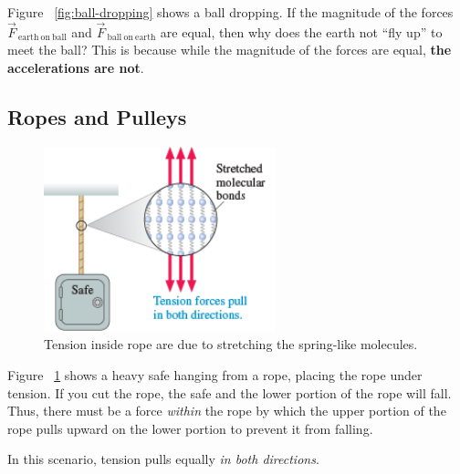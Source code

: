 Figure~%
\ref{fig:ball-dropping} shows a ball dropping.  If the magnitude of the
forces
$
    \vec{F}_{\mathrm{~earth~on~ball}}
$ and
$
    \vec{F}_{\mathrm{~ball~on~earth}}
$ are equal, then why does the earth not ``fly up'' to meet the ball?
This is because while the magnitude of the forces are equal, \textbf{the
accelerations are not}.

\subsection{Ropes and Pulleys}

\begin{figure}
    \centering
    \includegraphics[width=0.6\textwidth]{../figures/tension-inside-rope.png}
    \caption{Tension inside rope are due to stretching the spring-like
    molecules.}%
    \label{fig:tension-inside}
\end{figure}

Figure~%
\ref{fig:tension-inside} shows a heavy safe hanging from a rope, placing
the rope under tension.  If you cut the rope, the safe and the lower
portion of the rope will fall.  Thus, there must be a force \emph{within}
the rope by which the upper portion of the rope pulls upward on the
lower portion to prevent it from falling.
\begin{remark}
    In this scenario, tension pulls equally \emph{in both directions}.
\end{remark}


